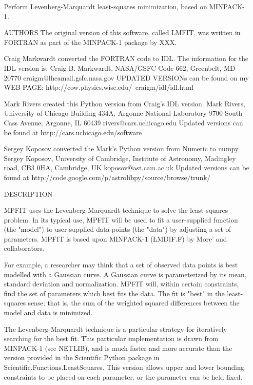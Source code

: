 \begin{DoxyVerb}Perform Levenberg-Marquardt least-squares minimization, based on MINPACK-1.

                       AUTHORS
  The original version of this software, called LMFIT, was written in FORTRAN
  as part of the MINPACK-1 package by XXX.

  Craig Markwardt converted the FORTRAN code to IDL.  The information for the
  IDL version is:
     Craig B. Markwardt, NASA/GSFC Code 662, Greenbelt, MD 20770
     craigm@lheamail.gsfc.nasa.gov
     UPDATED VERSIONs can be found on my WEB PAGE:
        http://cow.physics.wisc.edu/~craigm/idl/idl.html
    
  Mark Rivers created this Python version from Craig's IDL version.
    Mark Rivers, University of Chicago
    Building 434A, Argonne National Laboratory
    9700 South Cass Avenue, Argonne, IL 60439
    rivers@cars.uchicago.edu
    Updated versions can be found at http://cars.uchicago.edu/software
 
 Sergey Koposov converted the Mark's Python version from Numeric to numpy
    Sergey Koposov, University of Cambridge, Institute of Astronomy,
    Madingley road, CB3 0HA, Cambridge, UK
    koposov@ast.cam.ac.uk
    Updated versions can be found at http://code.google.com/p/astrolibpy/source/browse/trunk/

                     DESCRIPTION

 MPFIT uses the Levenberg-Marquardt technique to solve the
 least-squares problem.  In its typical use, MPFIT will be used to
 fit a user-supplied function (the "model") to user-supplied data
 points (the "data") by adjusting a set of parameters.  MPFIT is
 based upon MINPACK-1 (LMDIF.F) by More' and collaborators.

 For example, a researcher may think that a set of observed data
 points is best modelled with a Gaussian curve.  A Gaussian curve is
 parameterized by its mean, standard deviation and normalization.
 MPFIT will, within certain constraints, find the set of parameters
 which best fits the data.  The fit is "best" in the least-squares
 sense; that is, the sum of the weighted squared differences between
 the model and data is minimized.

 The Levenberg-Marquardt technique is a particular strategy for
 iteratively searching for the best fit.  This particular
 implementation is drawn from MINPACK-1 (see NETLIB), and is much faster
 and more accurate than the version provided in the Scientific Python package
 in Scientific.Functions.LeastSquares.
 This version allows upper and lower bounding constraints to be placed on each
 parameter, or the parameter can be held fixed.


\end{DoxyVerb}
